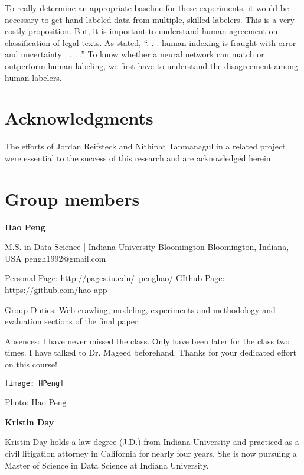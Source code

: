 \documentclass[11pt]{article}
\begin{document}
To really determine an appropriate baseline for these experiments, it would be necessary to get hand labeled data from multiple, skilled labelers.  This is a very costly proposition.  But, it is important to understand human agreement on classification of legal texts.  As \cite[~p. 6]{Dabney} stated, ``. . . human indexing is fraught with error and uncertainty . . . .''  To know whether a neural network can match or outperform human labeling, we first have to understand the disagreement among human labelers.  

\section*{Acknowledgments}

The efforts of Jordan Reifsteck and Nithipat Tanmanagul in a related project were essential to the success of this research and are acknowledged herein.  






\section*{Group members}
\noindent \textbf{Hao Peng}

M.S. in Data Science | Indiana University Bloomington
Bloomington, Indiana, USA
pengh1992@gmail.com

Personal Page: http://pages.iu.edu/~penghao/
GIthub Page: https://github.com/hao-app  

Group Duties:  Web crawling, modeling, experiments and methodology and evaluation sections of the final paper.

Absences:  I have never missed the class. Only have been later for the class two times. I have talked to Dr. Mageed beforehand. Thanks for your dedicated effort on this course!

\vspace{5mm}
\texttt{[image: HPeng]}

Photo: Hao Peng

\vspace{10mm}

\noindent \textbf{Kristin Day}

Kristin Day holds a law degree (J.D.) from Indiana University and practiced as a civil litigation attorney in California for nearly four years.  She is now pursuing a Master of Science in Data Science at Indiana University.  
\end{document}

